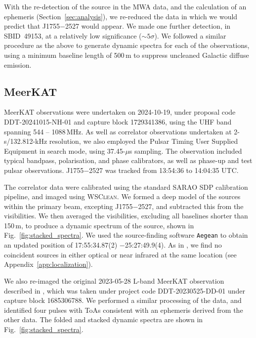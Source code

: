 \documentclass[fleqn,usenatbib]{mnras}
\newcommand{\src}{J1755$-$2527}
\newcommand{\Fig}{Fig.}
\newcommand{\Sect}{Section}
\begin{document}
With the re-detection of the source in the MWA data, and the calculation of an ephemeris (\Sect~\ref{sec:analysis}), we re-reduced the data in which we would predict that \src{} would appear. We made one further detection, in SBID~49153, at a relatively low significance ($\sim5\sigma$).
We followed a similar procedure as the above to generate dynamic spectra for each of the observations, using a minimum baseline length of 500\,m to suppress uncleaned Galactic diffuse emission.


\subsection{MeerKAT} \label{sec:meerkat}

MeerKAT observations were undertaken on 2024-10-19, under proposal code DDT-20241015-NH-01 and capture block 1729341386, using the UHF band spanning 544 -- 1088\,MHz.
As well as correlator observations undertaken at 2-s/132.812-kHz resolution, we also employed the Pulsar Timing User Supplied Equipment \citep[PTUSE;][]{2020PASA...37...28B} in search mode, using 37.45-$\mu$s sampling. The observation included typical bandpass, polarisation, and phase calibrators, as well as phase-up and test pulsar observations. \src{} was tracked from 13:54:36 to 14:04:35 UTC.

The correlator data were calibrated using the standard SARAO SDP calibration pipeline, and imaged using \textsc{WSClean}. We formed a deep model of the sources within the primary beam, excepting \src{}, and subtracted this from the visibilities.
We then averaged the visibilities, excluding all baselines shorter than 150\,m, to produce a dynamic spectrum of the source, shown in \Fig~\ref{fig:stacked_spectra}.
We used the source-finding software \texttt{Aegean} \citep{2018PASA...35...11H} to obtain an updated position of 17:55:34.87(2) $-$25:27:49.9(4).
As in , we find no coincident sources in either optical or near infrared at the same location (see Appendix~\ref{app:localization}).

We also re-imaged the original 2023-05-28 L-band MeerKAT observation described in , which was taken under project code DDT-20230525-DD-01 under capture block 1685306788. We performed a similar processing of the data, and identified four pulses with ToAs consistent with an ephemeris derived from the other data. The folded and stacked dynamic spectra are shown in \Fig~\ref{fig:stacked_spectra}.
\end{document}
